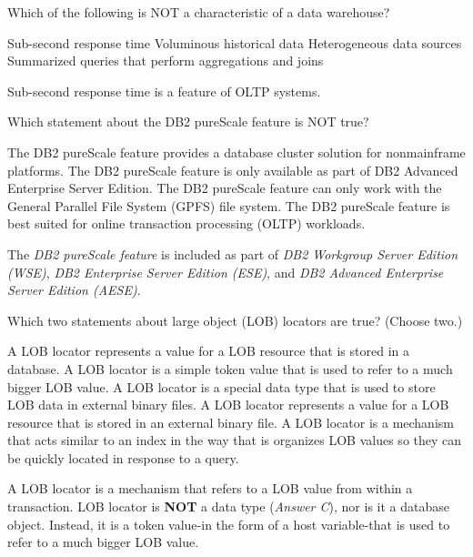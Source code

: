 \documentclass[answers, 11pt]{exam}
\begin{document}
\begin{questions}
\begin{solution}
\end{solution}


\question[1]
Which of the following is NOT a characteristic of a data warehouse?
\begin{choices}
\CorrectChoice Sub-second response time
\choice Voluminous historical data
\choice Heterogeneous data sources
\choice Summarized queries that perform aggregations and joins
\end{choices}

\begin{solution}
Sub-second response time is a feature of OLTP systems.
\end{solution}

\question[1]
Which statement about the DB2 pureScale feature is NOT true?
\begin{choices}
\choice The DB2 pureScale feature provides a database cluster solution for nonmainframe platforms.
\CorrectChoice The DB2 pureScale feature is only available as part of DB2 Advanced Enterprise Server Edition.
\choice The DB2 pureScale feature can only work with the General Parallel File System (GPFS) file system.
\choice The DB2 pureScale feature is best suited for online transaction processing (OLTP) workloads.
\end{choices}

\begin{solution}
The \textit{DB2 pureScale feature} is included as part of \textit{DB2 Workgroup
Server Edition (WSE)}, \textit{DB2 Enterprise Server Edition (ESE)}, and 
\textit{DB2 Advanced Enterprise Server Edition (AESE)}.
\end{solution}

\newpage
\addpoints

\question[1]
Which two statements about large object (LOB) locators are true? (Choose two.)
\begin{choices}
\CorrectChoice A LOB locator represents a value for a LOB resource that is stored in a database.
\CorrectChoice A LOB locator is a simple token value that is used to refer to a much bigger LOB value.
\choice A LOB locator is a special data type that is used to store LOB data in external binary files.
\choice A LOB locator represents a value for a LOB resource that is stored in an external binary file.
\choice A LOB locator is a mechanism that acts similar to an index in the way that is organizes LOB values
		so they can be quickly located in response to a query.
\end{choices}

\begin{solution}
A LOB locator is a mechanism that refers to a LOB value from within a transaction.
LOB locator is \textbf{NOT} a data type (\textit{Answer C}), nor is it a database
object. Instead, it is a token value-in the form of a host variable-that is used to
refer to a much bigger LOB value.
\par


\end{solution}
\end{questions}
\end{document}
